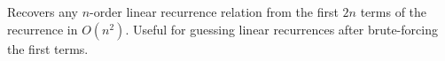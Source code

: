 Recovers any $n$-order linear recurrence relation from the first $2n$ terms of the recurrence in $O(n^2)$. Useful for guessing linear recurrences after brute-forcing the first terms. 
